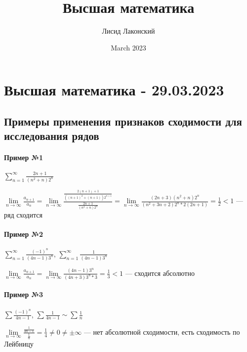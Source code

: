 \documentclass{article}
\title{Высшая математика}
\author{Лисид Лаконский}
\date{March 2023}
\begin{document}
\raggedright

\maketitle

\tableofcontents
\pagebreak

\section{Высшая математика - 29.03.2023}

\subsection{Примеры применения признаков сходимости для исследования рядов}

\paragraph{Пример №1}

$\sum\limits_{n = 1}^{\infty} \frac{2 n + 1}{(n^2 + n) 2^n}$

$\lim\limits_{n \to \infty} \frac{a_{n + 1}}{a_{n}} = \lim\limits_{n \to \infty} \frac{\frac{2 ( n + 1 ) + 1}{((n + 1)^2 + (n + 1)) 2^{n + 1}}}{\frac{2 n + 1}{(n^2 + n) 2^n}} = \lim\limits_{n \to \infty} \frac{(2 n + 3) (n^2 + n) 2^{n}}{(n^2 + 3 n + 2) 2^{n} * 2 (2 n + 1)} = \frac{1}{2} < 1$ — ряд сходится

\paragraph{Пример №2}

$\sum\limits_{n = 1}^{\infty} \frac{(-1)^{n}}{(4 n - 1) 3^{n}}$, $\sum\limits_{n = 1}^{\infty} \frac{1}{(4 n -1) 3^{n}}$

$\lim\limits_{n \to \infty} \frac{a_{n + 1}}{a_{n}} = \lim\limits_{n \to \infty} \frac{(4 n - 1) 3^{n}}{(4 n + 3) 3^{n} * 3} = \frac{1}{3} < 1$ — сходится абсолютно

\paragraph{Пример №3}

$\sum \frac{(-1)^{n}}{4 n - 1}$, $\sum \frac{1}{4 n - 1} \sim \sum \frac{1}{n}$

$\lim\limits_{n \to \infty} \frac{\frac{1}{4 n - 1}}{\frac{1}{n}} = \frac{1}{4} \ne 0 \ne \pm \infty$ — нет абсолютной сходимости, есть сходимость по Лейбницу
\end{document}
